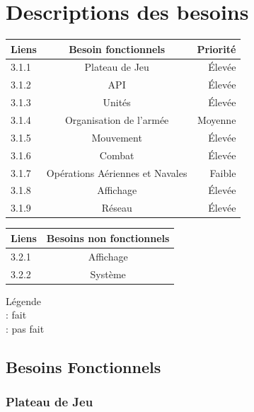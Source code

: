 
\section{Descriptions des besoins}


\begin{tabular}{|l|c|r|}
     \hline
    Liens & Besoin fonctionnels  & Priorité \\
    \hline
    3.1.1 & Plateau de Jeu & Élevée\\
    3.1.2 & API & Élevée\\ 
    3.1.3 & Unités & Élevée\\
    3.1.4 & Organisation de l'armée & Moyenne \\
    3.1.5 & Mouvement & Élevée \\
    3.1.6 & Combat & Élevée \\
    3.1.7 & Opérations Aériennes et Navales & Faible \\ 
    3.1.8 & Affichage & Élevée \\ 
    3.1.9 & Réseau  & Élevée \\
    \hline 
    
\end{tabular}

\begin{tabular}{l|c}
    \hline 
    Liens & Besoins non fonctionnels\\
    \hline
    3.2.1 & Affichage\\ 
    3.2.2 & Système\\
    \hline
\end{tabular}

Légende\\
\cmark : fait \\
\xmark : pas fait \\


\subsection{Besoins Fonctionnels}
\subsubsection{Plateau de Jeu}


